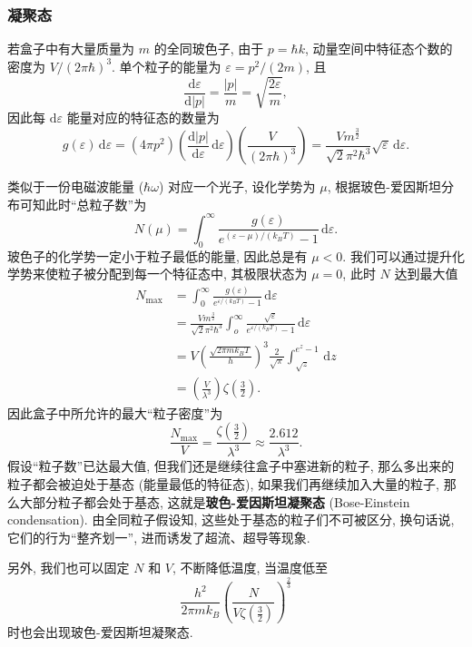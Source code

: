 \subsubsection*{凝聚态}
若盒子中有大量质量为 $ m $ 的全同玻色子, 由于 $ p=\hbar k $, 动量空间中特征态个数的密度为 $ V/(2\pi\hbar)^3 $. 单个粒子的能量为 $ \varepsilon=p^2/(2m) $, 且
\[ \frac{\mathrm{d}\varepsilon}{\mathrm{d}|p|}=\frac{|p|}{m}=\sqrt{\frac{2\varepsilon}{m}}, \]
因此每 $ \mathrm{d}\varepsilon $ 能量对应的特征态的数量为
\[ g(\varepsilon)\,\mathrm{d}\varepsilon=(4\pi p^2)\left( \frac{\mathrm{d}|p|}{\mathrm{d}\varepsilon}\,\mathrm{d}\varepsilon \right)\left( \frac{V}{(2\pi\hbar)^3} \right)=\frac{Vm^{\frac{3}{2}}}{\sqrt{2}\pi^2\hbar^3}\sqrt{\varepsilon}\,\mathrm{d}\varepsilon. \]

类似于一份电磁波能量 ($ \hbar\omega $) 对应一个光子, 设化学势为 $ \mu $, 根据玻色-爱因斯坦分布可知此时``总粒子数''为
\[ N(\mu)=\int_{0}^{\infty}\frac{g(\varepsilon)}{e^{(\varepsilon-\mu)/(k_BT)}-1}\,\mathrm{d}\varepsilon. \]
玻色子的化学势一定小于粒子最低的能量, 因此总是有 $ \mu<0 $. 我们可以通过提升化学势来使粒子被分配到每一个特征态中, 其极限状态为 $ \mu=0 $, 此时 $ N $ 达到最大值
\begin{align*}
    N_{\mathrm{max}} &= \int_0^\infty\frac{g(\varepsilon)}{e^{\varepsilon/(k_BT)}-1}\,\mathrm{d}\varepsilon\\ 
    &= \frac{Vm^{\frac{3}{2}}}{\sqrt{2}\pi^2\hbar^3}\int_{o}^{\infty}\frac{\sqrt{\varepsilon}}{e^{\varepsilon/(k_BT)}-1}\,\mathrm{d}\varepsilon\\ 
    &=V\left( \frac{\sqrt{2\pi mk_BT}}{h} \right)^3\frac{2}{\sqrt{\pi}}\int_{\sqrt{z}}^{e^z-1}\,\mathrm{d}z\\ 
    &=\left( \frac{V}{\lambda^3} \right)\zeta\left( \frac{3}{2} \right).
\end{align*}
因此盒子中所允许的最大``粒子密度''为
\[ \frac{N_{\mathrm{max}}}{V}=\frac{\zeta\left( \frac{3}{2} \right)}{\lambda^3}\approx\frac{2.612}{\lambda^3}. \]
假设``粒子数''已达最大值, 但我们还是继续往盒子中塞进新的粒子, 那么多出来的粒子都会被迫处于基态 (能量最低的特征态), 如果我们再继续加入大量的粒子, 那么大部分粒子都会处于基态, 这就是{\bf 玻色-爱因斯坦凝聚态} (Bose-Einstein condensation). 由全同粒子假设知, 这些处于基态的粒子们不可被区分, 换句话说, 它们的行为``整齐划一'', 进而诱发了超流、超导等现象.

另外, 我们也可以固定 $ N $ 和 $ V $, 不断降低温度, 当温度低至
\[ \frac{h^2}{2\pi mk_B}\left( \frac{N}{V\zeta\left( \frac{3}{2} \right)} \right)^{\frac{2}{3}} \]
时也会出现玻色-爱因斯坦凝聚态.